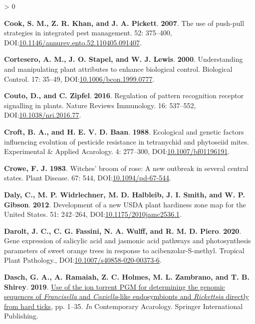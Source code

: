 \documentclass{ufdissertation}[overrideChapters] %
\newlength{\cslhangindent}
\newenvironment{CSLReferences}[2] %
 {%
  \setlength{\parindent}{0pt}
  \ifodd #1 \everypar{\setlength{\hangindent}{\cslhangindent}}\ignorespaces\fi
  \ifnum #2 > 0
  \setlength{\parskip}{#2\baselineskip}
  \fi
 }%
 {}
\begin{document}
{\begin{CSLReferences}{1}{1}
\leavevmode{}%
\textbf{Cook, S. M., Z. R. Khan, and J. A. Pickett}. \textbf{2007}. The use of push-pull strategies in integrated pest management. 52: 375--400, DOI:\href{https://doi.org/10.1146/annurev.ento.52.110405.091407}{10.1146/annurev.ento.52.110405.091407}.

\leavevmode{}%
\textbf{Cortesero, A. M., J. O. Stapel, and W. J. Lewis}. \textbf{2000}. Understanding and manipulating plant attributes to enhance biological control. Biological Control. 17: 35--49, DOI:\href{https://doi.org/10.1006/bcon.1999.0777}{10.1006/bcon.1999.0777}.

\leavevmode{}%
\textbf{Couto, D., and C. Zipfel}. \textbf{2016}. Regulation of pattern recognition receptor signalling in plants. Nature Reviews Immunology. 16: 537--552, DOI:\href{https://doi.org/10.1038/nri.2016.77}{10.1038/nri.2016.77}.

\leavevmode{}%
\textbf{Croft, B. A., and H. E. V. D. Baan}. \textbf{1988}. Ecological and genetic factors influencing evolution of pesticide resistance in tetranychid and phytoseiid mites. Experimental {\&} Applied Acarology. 4: 277--300, DOI:\href{https://doi.org/10.1007/bf01196191}{10.1007/bf01196191}.

\leavevmode{}%
\textbf{Crowe, F. J.} \textbf{1983}. Witches' broom of rose: A new outbreak in several central states. Plant Disease. 67: 544, DOI:\href{https://doi.org/10.1094/pd-67-544}{10.1094/pd-67-544}.

\leavevmode{}%
\textbf{Daly, C., M. P. Widrlechner, M. D. Halbleib, J. I. Smith, and W. P. Gibson}. \textbf{2012}. Development of a new {USDA} plant hardiness zone map for the {United} {States}. 51: 242--264, DOI:\href{https://doi.org/10.1175/2010jamc2536.1}{10.1175/2010jamc2536.1}.

\leavevmode{}%
\textbf{Darolt, J. C., C. G. Fassini, N. A. Wulff, and R. M. D. Piero}. \textbf{2020}. Gene expression of salicylic acid and jasmonic acid pathways and photosynthesis parameters of sweet orange trees in response to acibenzolar-{S}-methyl. Tropical Plant Pathology., DOI:\href{https://doi.org/10.1007/s40858-020-00373-6}{10.1007/s40858-020-00373-6}.

\leavevmode{}%
\textbf{Dasch, G. A., A. Ramaiah, Z. C. Holmes, M. L. Zambrano, and T. B. Shirey}. \textbf{2019}. \href{https://doi.org/10.1007/978-3-030-17265-7_1}{Use of the ion torrent {PGM} for determining the genomic sequences of {\emph{Francisella}} and {\emph{Coxiella}}-like endosymbionts and {\emph{Rickettsia}} directly from hard ticks}, pp. 1--35. \emph{In} Contemporary Acarology. Springer International Publishing.


\end{CSLReferences}}
\end{document}

